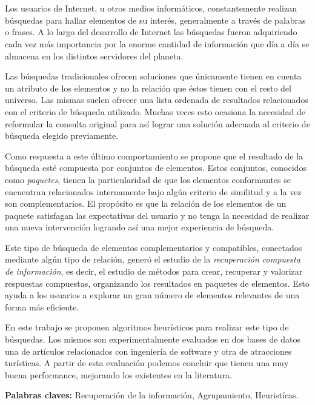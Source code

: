 \chapter*{\runtitulo}

\noindent 

Los usuarios de Internet, u otros medios informáticos, constantemente realizan búsquedas para hallar elementos de su interés, generalmente a través de palabras o frases. A lo largo del desarrollo de Internet las búsquedas fueron adquiriendo cada vez más importancia por la enorme cantidad de información que día a día se almacena en los distintos servidores del planeta.

Las búsquedas tradicionales ofrecen soluciones que únicamente tienen en cuenta un atributo de los elementos y no la relación que éstos tienen con el resto del universo. Las mismas suelen ofrecer una lista ordenada de resultados relacionados con el criterio de búsqueda utilizado. Muchas veces esto ocasiona la necesidad de reformular la consulta original para así lograr una solución adecuada al criterio de búsqueda elegido previamente.

Como respuesta a este último comportamiento se propone que el resultado de la búsqueda esté compuesta por conjuntos de elementos. Estos conjuntos, conocidos como {\em paquetes}, tienen la particularidad de que los elementos conformantes se encuentran relacionados internamente bajo algún criterio de similitud y a la vez son complementarios. El propósito es que la relación de los elementos de un paquete satisfagan las expectativas del usuario y no tenga la necesidad de realizar una nueva intervención logrando así una mejor experiencia de búsqueda.

Este tipo de búsqueda de elementos complementarios y compatibles, conectados mediante algún tipo de relación, generó el estudio de la {\em recuperación compuesta de información}, es decir, el estudio de métodos para crear, recuperar y valorizar respuestas compuestas, organizando los resultados en paquetes de elementos. Esto ayuda a los usuarios a explorar un gran número de elementos relevantes de una forma más eficiente.

En este trabajo se proponen algoritmos heurísticos para realizar este tipo de búsquedas. Los mismos son experimentalmente evaluados en dos bases de datos una de artículos relacionados con ingeniería de software y otra de atracciones turísticas. A partir de esta evaluación podemos concluir que tienen una muy buena performance, mejorando los existentes en la literatura.
\bigskip


\noindent\textbf{Palabras claves:} Recuperación de la información, Agrupamiento, Heuristícas.